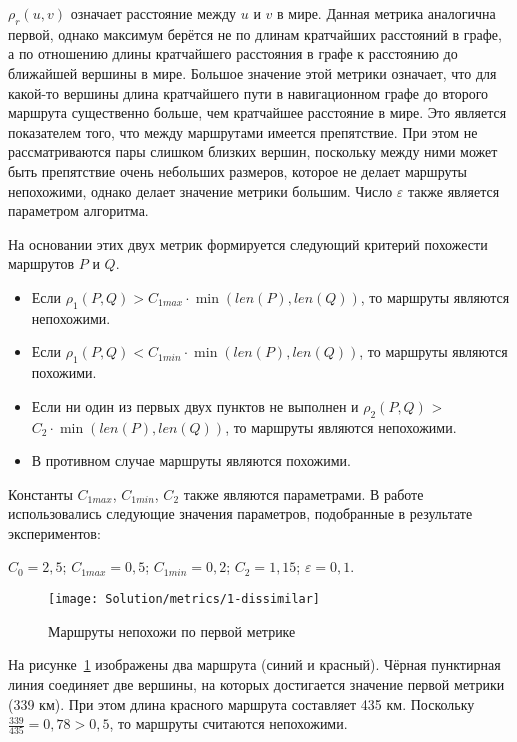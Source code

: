 $\rho_r(u, v)$ означает расстояние между $u$ и $v$ в мире. Данная
метрика аналогична первой, однако максимум берётся не по длинам
кратчайших расстояний в графе, а по отношению длины кратчайшего
расстояния в графе к расстоянию до ближайшей вершины в мире. Большое
значение этой метрики означает, что для какой-то вершины длина кратчайшего
пути в навигационном графе до второго маршрута существенно больше, чем
кратчайшее расстояние в мире. Это является показателем того, что между
маршрутами имеется препятствие. При этом не рассматриваются пары
слишком близких вершин, поскольку между ними может быть препятствие
очень небольших размеров, которое не делает маршруты непохожими,
однако делает значение метрики большим. Число $\varepsilon$ также
является параметром алгоритма.

На основании этих двух метрик формируется следующий критерий
похожести маршрутов $P$ и $Q$.
\begin{itemize}
  \item Если $\rho_1(P, Q) > C_{1max} \cdot \min(len(P), len(Q))$, то
    маршруты являются непохожими.
  \item Если $\rho_1(P, Q) < C_{1min} \cdot \min(len(P), len(Q))$, то
    маршруты являются похожими.
  \item Если ни один из первых двух пунктов не выполнен и $\rho_2(P,
    Q)$ > $C_2 \cdot \min(len(P), len(Q))$, то маршруты являются непохожими.

  \item В противном случае маршруты являются похожими.
\end{itemize}

Константы $C_{1max}$, $C_{1min}$, $C_2$ также являются параметрами. В
работе использовались следующие значения параметров, подобранные в результате экспериментов:

$C_0 = 2,5$; $C_{1max} = 0,5$; $C_{1min} = 0,2$; $C_2 = 1,15$;
$\varepsilon = 0,1$.

\begin{figure}
    \texttt{[image: Solution/metrics/1-dissimilar]}
    \caption{Маршруты непохожи по первой метрике}
    \label{fig:1-dissimilar}
\end{figure}

На рисунке~\ref{fig:1-dissimilar} изображены два маршрута (синий и
красный). Чёрная пунктирная линия соединяет две вершины, на которых
достигается значение первой метрики (339 км). При этом длина красного
маршрута составляет 435 км. Поскольку $\frac{339}{435} = 0,78 > 0,5$,
то маршруты считаются непохожими.

